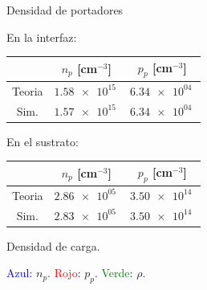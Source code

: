 \documentclass{/home/daniel/GitHub/USC-Physics-Degree-Notes/Notes/Presentacion}
\begin{document}
\begin{frame}{Densidad de portadores}
    \begin{minipage}{0.4\linewidth}
        \begin{center}
            \small
            En la interfaz: 
            \vspace*{1em}

            \begin{tabular}{ccc}
                \toprule
                & $n_p $ [cm$^{-3}$] & $p_p $ [cm$^{-3}$]  \\ \midrule
                Teoria & $\SI{1.58e+15}{}$& $\SI{6.34e+04}{}$ \\

                Sim. & $\SI{1.57e+15}{}$ & $\SI{6.34e+04}{}$  \\
                \bottomrule
            \end{tabular}

            \vspace*{2em}

            En el sustrato: 

            \vspace*{1em}


            \begin{tabular}{ccc}
                \toprule
                & $n_p $ [cm$^{-3}$] & $p_p $ [cm$^{-3}$]  \\ \midrule
                Teoria & $\SI{2.86e+05}{}$ & $\SI{3.50e+14}{}$ \\
                Sim. & $\SI{2.83e+05}{}$ & $\SI{3.50e+14}{}$ \\
                \bottomrule
            \end{tabular}

        \end{center}
    \end{minipage}
    \hfill
    \begin{minipage}{0.55\linewidth}\centering

        Densidad de carga.

        \vspace*{0.5em}

        \textcolor{blue}{Azul}: $n_p$. \textcolor{red}{Rojo}: $p_p$. \textcolor{Green}{Verde}: $\rho$.  

        \vspace*{1em}


\end{minipage}
\end{frame}
\end{document}
